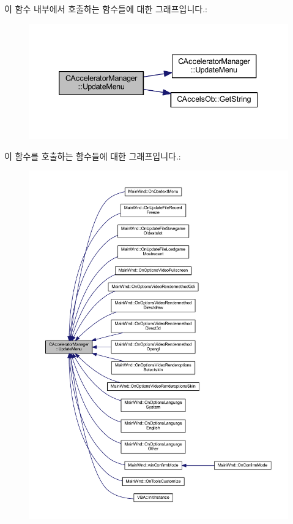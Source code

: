 이 함수 내부에서 호출하는 함수들에 대한 그래프입니다.\+:
\nopagebreak
\begin{figure}[H]
\begin{center}
\leavevmode
\includegraphics[width=339pt]{class_c_accelerator_manager_ac7411d20f413ea0ec3bd65705b564adf_cgraph}
\end{center}
\end{figure}
이 함수를 호출하는 함수들에 대한 그래프입니다.\+:
\nopagebreak
\begin{figure}[H]
\begin{center}
\leavevmode
\includegraphics[width=350pt]{class_c_accelerator_manager_ac7411d20f413ea0ec3bd65705b564adf_icgraph}
\end{center}
\end{figure}
\mbox{\label{class_c_accelerator_manager_ac854ec5263a7bab961bf63aec3938984}} 
